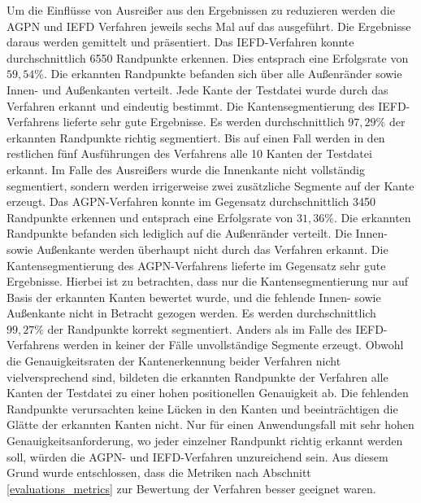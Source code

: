 Um die Einflüsse von Ausreißer aus den Ergebnissen zu reduzieren werden die AGPN und IEFD Verfahren jeweils sechs Mal auf das \testcloud ausgeführt. Die Ergebnisse daraus werden gemittelt und präsentiert. Das IEFD-Verfahren konnte durchschnittlich 6550 Randpunkte erkennen. Dies entsprach eine Erfolgsrate von $59,54\%$. Die erkannten Randpunkte befanden sich über alle Außenränder sowie Innen- und Außenkanten verteilt. Jede Kante der Testdatei wurde durch das Verfahren erkannt und eindeutig bestimmt. Die Kantensegmentierung des IEFD-Verfahrens lieferte sehr gute Ergebnisse. Es werden durchschnittlich $97,29\%$ der erkannten Randpunkte richtig segmentiert. Bis auf einen Fall werden in den restlichen fünf Ausführungen des Verfahrens alle 10 Kanten der Testdatei erkannt. Im Falle des Ausreißers wurde die Innenkante nicht vollständig segmentiert, sondern werden irrigerweise zwei zusätzliche Segmente auf der Kante erzeugt. Das AGPN-Verfahren konnte im Gegensatz durchschnittlich 3450 Randpunkte erkennen und entsprach eine Erfolgsrate von $31,36\%$. Die erkannten Randpunkte befanden sich lediglich auf die Außenränder verteilt. Die Innen- sowie Außenkante werden überhaupt nicht durch das Verfahren erkannt. Die Kantensegmentierung des AGPN-Verfahrens lieferte im Gegensatz sehr gute Ergebnisse. Hierbei ist zu betrachten, dass nur die Kantensegmentierung nur auf Basis der erkannten Kanten bewertet wurde, und die fehlende Innen- sowie Außenkante nicht in Betracht gezogen werden. Es werden durchschnittlich $99,27\%$ der Randpunkte korrekt segmentiert. Anders als im Falle des IEFD-Verfahrens werden in keiner der Fälle unvollständige Segmente erzeugt. Obwohl die Genauigkeitsraten der Kantenerkennung beider Verfahren nicht vielversprechend sind, bildeten die erkannten Randpunkte der Verfahren alle Kanten der Testdatei zu einer hohen positionellen Genauigkeit ab. Die fehlenden Randpunkte verursachten keine Lücken in den Kanten und beeinträchtigen die Glätte der erkannten Kanten nicht. Nur für einen Anwendungsfall mit sehr hohen Genauigkeitsanforderung, wo jeder einzelner Randpunkt richtig erkannt werden soll, würden die AGPN- und IEFD-Verfahren unzureichend sein. Aus diesem Grund wurde entschlossen, dass die Metriken nach Abschnitt \ref{evaluations_metrics} zur Bewertung der Verfahren besser geeignet waren. 


